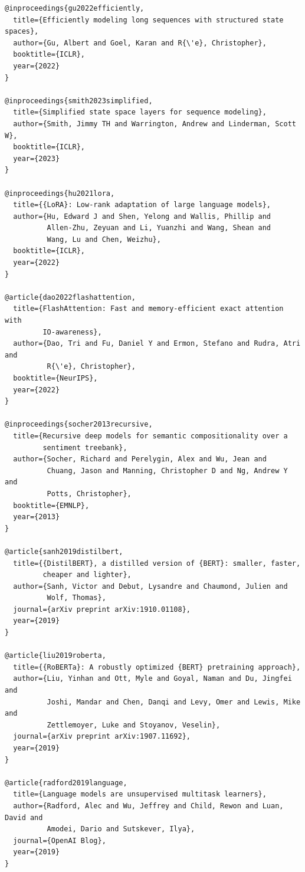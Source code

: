 \begin{lstlisting}
@inproceedings{gu2022efficiently,
  title={Efficiently modeling long sequences with structured state spaces},
  author={Gu, Albert and Goel, Karan and R{\'e}, Christopher},
  booktitle={ICLR},
  year={2022}
}

@inproceedings{smith2023simplified,
  title={Simplified state space layers for sequence modeling},
  author={Smith, Jimmy TH and Warrington, Andrew and Linderman, Scott W},
  booktitle={ICLR},
  year={2023}
}

@inproceedings{hu2021lora,
  title={{LoRA}: Low-rank adaptation of large language models},
  author={Hu, Edward J and Shen, Yelong and Wallis, Phillip and 
          Allen-Zhu, Zeyuan and Li, Yuanzhi and Wang, Shean and 
          Wang, Lu and Chen, Weizhu},
  booktitle={ICLR},
  year={2022}
}

@article{dao2022flashattention,
  title={FlashAttention: Fast and memory-efficient exact attention with 
         IO-awareness},
  author={Dao, Tri and Fu, Daniel Y and Ermon, Stefano and Rudra, Atri and 
          R{\'e}, Christopher},
  booktitle={NeurIPS},
  year={2022}
}

@inproceedings{socher2013recursive,
  title={Recursive deep models for semantic compositionality over a 
         sentiment treebank},
  author={Socher, Richard and Perelygin, Alex and Wu, Jean and 
          Chuang, Jason and Manning, Christopher D and Ng, Andrew Y and 
          Potts, Christopher},
  booktitle={EMNLP},
  year={2013}
}

@article{sanh2019distilbert,
  title={{DistilBERT}, a distilled version of {BERT}: smaller, faster, 
         cheaper and lighter},
  author={Sanh, Victor and Debut, Lysandre and Chaumond, Julien and 
          Wolf, Thomas},
  journal={arXiv preprint arXiv:1910.01108},
  year={2019}
}

@article{liu2019roberta,
  title={{RoBERTa}: A robustly optimized {BERT} pretraining approach},
  author={Liu, Yinhan and Ott, Myle and Goyal, Naman and Du, Jingfei and 
          Joshi, Mandar and Chen, Danqi and Levy, Omer and Lewis, Mike and 
          Zettlemoyer, Luke and Stoyanov, Veselin},
  journal={arXiv preprint arXiv:1907.11692},
  year={2019}
}

@article{radford2019language,
  title={Language models are unsupervised multitask learners},
  author={Radford, Alec and Wu, Jeffrey and Child, Rewon and Luan, David and 
          Amodei, Dario and Sutskever, Ilya},
  journal={OpenAI Blog},
  year={2019}
}
\end{lstlisting}




